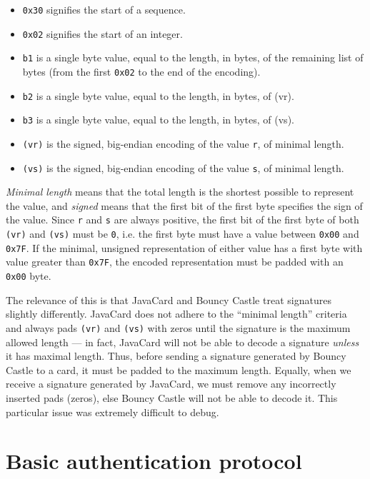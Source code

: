 \documentclass[12pt,a4paper,twoside,openright]{report}
\begin{document}
\begin{itemize}
\item \texttt{0x30} signifies the start of a sequence.
\item \texttt{0x02} signifies the start of an integer.
\item \texttt{b1} is a single byte value, equal to the length, in bytes, of the remaining list of bytes (from the first \texttt{0x02} to the end of the encoding).
\item \texttt{b2} is a single byte value, equal to the length, in bytes, of (vr).
\item \texttt{b3} is a single byte value, equal to the length, in bytes, of (vs).
\item \texttt{(vr)} is the signed, big-endian encoding of the value \texttt{r}, of minimal length.
\item \texttt{(vs)} is the signed, big-endian encoding of the value \texttt{s}, of minimal length.
\end{itemize}

\noindent
\emph{Minimal length} means that the total length is the shortest possible to represent the value, and \emph{signed} means that the first bit of the first byte specifies the sign of the value. Since \texttt{r} and \texttt{s} are always positive, the first bit of the first byte of both \texttt{(vr)} and \texttt{(vs)} must be \texttt{0}, i.e. the first byte must have a value between \texttt{0x00} and \texttt{0x7F}. If the minimal, unsigned representation of either value has a first byte with value greater than \texttt{0x7F}, the encoded representation must be padded with an \texttt{0x00} byte.

The relevance of this is that JavaCard and Bouncy Castle treat signatures slightly differently. JavaCard does not adhere to the ``minimal length'' criteria and always pads \texttt{(vr)} and \texttt{(vs)} with zeros until the signature is the maximum allowed length --- in fact, JavaCard will not be able to decode a signature \emph{unless} it has maximal length. Thus, before sending a signature generated by Bouncy Castle to a card, it must be padded to the maximum length. Equally, when we receive a signature generated by JavaCard, we must remove any incorrectly inserted pads (zeros), else Bouncy Castle will not be able to decode it. This particular issue was extremely difficult to debug.

\section{Basic authentication protocol}
\label{basicauth}
\end{document}
